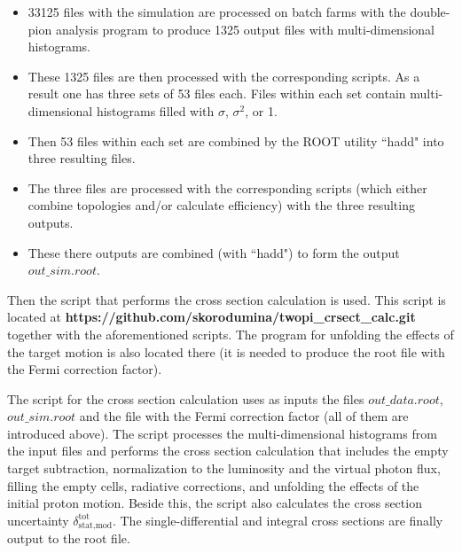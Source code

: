 \begin{itemize}
\item 33125 files with the simulation are processed on batch farms with the double-pion analysis program to produce 1325 output files with multi-dimensional histograms.\vspace{-0.7em}

\item These 1325 files are then processed with the corresponding scripts. As a result one has three sets of 53 files each. Files within each set contain multi-dimensional histograms filled with $\sigma$, $\sigma^{2}$, or 1.\vspace{-0.7em}

\item Then 53 files within each set are combined by the ROOT utility ``hadd" into three resulting files.\vspace{-0.7em}

\item The three files are processed with the corresponding scripts (which either combine topologies and/or calculate efficiency) with the three resulting outputs.\vspace{-0.7em}
\item These there outputs are combined (with ``hadd") to form the output $out\_sim.root$. \vspace{-0.5em}

\end{itemize}




Then the script that performs the cross section calculation is used. This script is located at {\bf https://github.com/skorodumina/twopi\_crsect\_calc.git} together with the aforementioned scripts. The program for unfolding the effects of the target motion is also located there (it is needed to produce the root file with the Fermi correction factor).

The script for the cross section calculation uses as inputs the files $out\_data.root$, $out\_sim.root$ and the file with the Fermi correction factor (all of them are introduced above). The script processes the multi-dimensional histograms from the input files and performs the cross section calculation that includes the empty target subtraction, normalization to the luminosity and the virtual photon flux, filling the empty cells, radiative corrections, and unfolding the effects of the initial proton motion. Beside this, the script also calculates the cross section uncertainty $\delta_{\text{stat,mod}}^{\text{tot}}$. The single-differential and integral cross sections are finally output to the root file.

